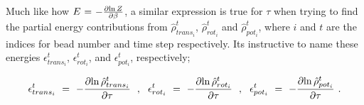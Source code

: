 \documentclass[11pt]{article}
\begin{document}
Much like how \begin{math} E \hspace{0.025cm} = \hspace{0.025cm} - \frac{\partial{\ln{Z}}}{\partial{\beta}} \end{math}, a similar expression is true for \begin{math} \tau \end{math} when trying to find the partial energy contributions from \begin{math} \hat{\rho}_{trans_i}^t \end{math}, \begin{math} \hat{\rho}_{rot_i}^t \end{math} and \begin{math} \hat{\rho}_{pot_i}^t \end{math}, where \begin{math} i \end{math} and \begin{math} t \end{math} are the indices for bead number and time step respectively. Its instructive to name these energies \begin{math} \epsilon_{trans_i}^t \end{math}, \begin{math} \epsilon_{rot_i}^t \end{math}, and \begin{math} \epsilon_{pot_i}^t \end{math}, respectively;

\begin{equation} \label{wr-eq-58-1}
\epsilon_{trans_i}^t \hspace{0.125cm} = \hspace{0.125cm} - \frac{\partial{\ln{\hat{\rho}_{trans_i}^t}}}{\partial{\tau}} \hspace{0.225cm} , \hspace{0.225cm} \epsilon_{rot_i}^t \hspace{0.125cm} = \hspace{0.125cm} - \frac{\partial{\ln{\hat{\rho}_{rot_i}^t}}}{\partial{\tau}} \hspace{0.225cm} , \hspace{0.225cm} \epsilon_{pot_i}^t \hspace{0.125cm} = \hspace{0.125cm} - \frac{\partial{\ln{\hat{\rho}_{pot_i}^t}}}{\partial{\tau}}\hspace{0.125cm} .
\end{equation}
\end{document}
